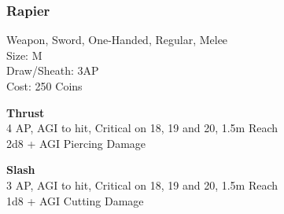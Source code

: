 \subsubsection{Rapier}\label{weapon:rapier}
Weapon, Sword, One-Handed, Regular, Melee\\
Size: M\\
Draw/Sheath: 3AP\\
Cost: 250 Coins

\textbf{Thrust}\\
4 AP, AGI to hit, Critical on 18, 19 and 20, 1.5m Reach\\
2d8 + \texttimes AGI Piercing Damage

\textbf{Slash}\\
3 AP, AGI to hit, Critical on 18, 19 and 20, 1.5m Reach\\
1d8 + \texttimes AGI Cutting Damage